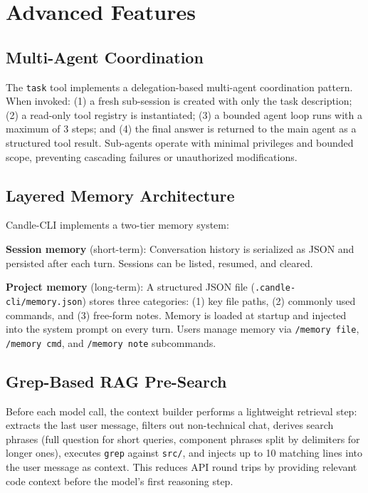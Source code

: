 \documentclass[11pt]{article}
\begin{document}
\section{Advanced Features}
\label{sec:advanced}

\subsection{Multi-Agent Coordination}
\label{sec:multiagent}

The \texttt{task} tool implements a delegation-based multi-agent coordination pattern. When invoked: (1) a fresh sub-session is created with only the task description; (2) a read-only tool registry is instantiated; (3) a bounded agent loop runs with a maximum of 3 steps; and (4) the final answer is returned to the main agent as a structured tool result. Sub-agents operate with minimal privileges and bounded scope, preventing cascading failures or unauthorized modifications.

\subsection{Layered Memory Architecture}

Candle-CLI implements a two-tier memory system:

\textbf{Session memory} (short-term): Conversation history is serialized as JSON and persisted after each turn. Sessions can be listed, resumed, and cleared.

\textbf{Project memory} (long-term): A structured JSON file (\texttt{.candle-cli/memory.json}) stores three categories: (1) key file paths, (2) commonly used commands, and (3) free-form notes. Memory is loaded at startup and injected into the system prompt on every turn. Users manage memory via \texttt{/memory file}, \texttt{/memory cmd}, and \texttt{/memory note} subcommands.

\subsection{Grep-Based RAG Pre-Search}

Before each model call, the context builder performs a lightweight retrieval step: extracts the last user message, filters out non-technical chat, derives search phrases (full question for short queries, component phrases split by delimiters for longer ones), executes \texttt{grep} against \texttt{src/}, and injects up to 10 matching lines into the user message as context. This reduces API round trips by providing relevant code context before the model's first reasoning step.
\end{document}

